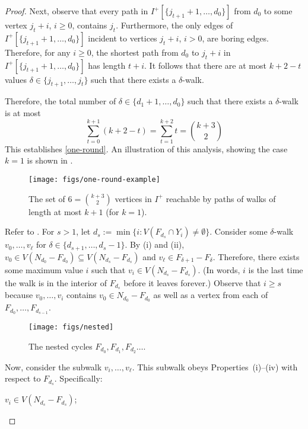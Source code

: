 \documentclass{patmorin}
\begin{document}
\begin{proof}
  Next, observe that every path in $I^+[\{j_{t+1}+1,\ldots,d_0\}]$ from $d_0$ to some vertex  $j_{t}+i$, $i\ge 0$, contains $j_t$.  Furthermore, the only edges of $I^+[\{j_{t+1}+1,\ldots,d_0\}]$ incident to vertices $j_t+i$, $i>0$, are boring edges.  Therefore, for any $i\ge 0$, the shortest path from $d_0$ to $j_t+i$ in $I^+[\{j_{t+1}+1,\ldots,d_0\}]$ has length $t+i$.  It follows that there are at most $k+2-t$ values $\delta\in\{j_{t+1},\ldots,j_t\}$ such that there exists a $\delta$-walk.
  
  Therefore, the total number of $\delta\in\{d_1+1,\ldots,d_0\}$ such that there exists a $\delta$-walk is at most
  \[
     \sum_{t=0}^{k+1} (k+2-t) = \sum_{t=1}^{k+2} t = \binom{k+3}{2}
  \]
  This establishes \eqref{one-round}.  An illustration of this analysis, showing the case $k=1$ is shown in .
  \begin{figure}[htbp]
    \begin{center}
      \texttt{[image: figs/one-round-example]}
    \end{center}
    \caption{The set of $6=\binom{k+3}{2}$ vertices in $I^+$ reachable by paths of walks of length at most $k+1$ (for $k=1$).}
  \end{figure}
  
  
  Refer to . For $s>1$, let $d_s:=\min\{i: V(F_{d_s}\cap Y_i)\neq\emptyset \}$. Consider some $\delta$-walk $v_0,\ldots,v_\ell$ for $\delta\in \{ d_{s+1},\ldots,d_{s}-1\}$.  By (i) and (ii), $v_0\in V(N_{d_0}-F_{d_0})\subseteq V(N_{d_s}-F_{d_s})$ and $v_\ell\in F_{\delta+1}-F_\delta$.  Therefore, there exists some maximum value $i$ such that $v_i\in V(N_{d_{s}}-F_{d_{s}})$.  (In words, $i$ is the last time the walk is in the interior of $F_{d_s}$ before it leaves forever.)
  Observe that $i\ge s$ because $v_0,\ldots,v_i$ contains $v_0\in N_{d_0}-F_{d_0}$ as well as a vertex from each of $F_{d_0},\ldots,F_{d_{s-1}}$.  

  \begin{figure}
    \begin{center}
      \texttt{[image: figs/nested]}
    \end{center}
    \caption{The nested cycles $F_{d_0}, F_{d_1},F_{d_2}\ldots$.}
  \end{figure}
  
  Now, consider the subwalk $v_i,\ldots,v_\ell$.  This subwalk obeys Properties~(i)--(iv) with respect to $F_{d_s}$.  Specifically:
  \begin{compactenum}[(i)]
    \item $v_i\in V(N_{d_s}-F_{d_s})$;
    

\end{compactenum}
\end{proof}
\end{document}
